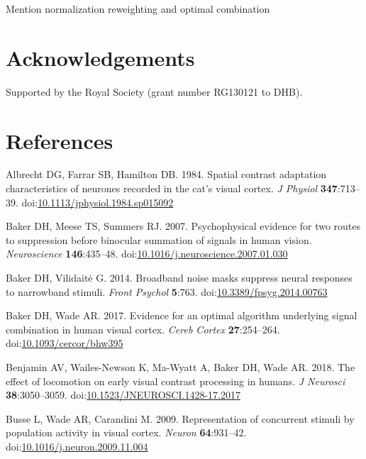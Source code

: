 \documentclass[]{article}
\begin{document}
Mention normalization reweighting and optimal combination

\hypertarget{acknowledgements}{%
\section{Acknowledgements}\label{acknowledgements}}

Supported by the Royal Society (grant number RG130121 to DHB).

\hypertarget{references}{%
\section*{References}\label{references}}

\hypertarget{refs}{}
\leavevmode\hypertarget{ref-Albrecht1984}{}%
Albrecht DG, Farrar SB, Hamilton DB. 1984. Spatial contrast adaptation characteristics of neurones recorded in the cat's visual cortex. \emph{J Physiol} \textbf{347}:713--39. doi:\href{https://doi.org/10.1113/jphysiol.1984.sp015092}{10.1113/jphysiol.1984.sp015092}

\leavevmode\hypertarget{ref-Baker2007}{}%
Baker DH, Meese TS, Summers RJ. 2007. Psychophysical evidence for two routes to suppression before binocular summation of signals in human vision. \emph{Neuroscience} \textbf{146}:435--48. doi:\href{https://doi.org/10.1016/j.neuroscience.2007.01.030}{10.1016/j.neuroscience.2007.01.030}

\leavevmode\hypertarget{ref-Baker2014}{}%
Baker DH, Vilidaitė G. 2014. Broadband noise masks suppress neural responses to narrowband stimuli. \emph{Front Psychol} \textbf{5}:763. doi:\href{https://doi.org/10.3389/fpsyg.2014.00763}{10.3389/fpsyg.2014.00763}

\leavevmode\hypertarget{ref-Baker2017}{}%
Baker DH, Wade AR. 2017. Evidence for an optimal algorithm underlying signal combination in human visual cortex. \emph{Cereb Cortex} \textbf{27}:254--264. doi:\href{https://doi.org/10.1093/cercor/bhw395}{10.1093/cercor/bhw395}

\leavevmode\hypertarget{ref-Benjamin2018}{}%
Benjamin AV, Wailes-Newson K, Ma-Wyatt A, Baker DH, Wade AR. 2018. The effect of locomotion on early visual contrast processing in humans. \emph{J Neurosci} \textbf{38}:3050--3059. doi:\href{https://doi.org/10.1523/JNEUROSCI.1428-17.2017}{10.1523/JNEUROSCI.1428-17.2017}

\leavevmode\hypertarget{ref-Busse2009}{}%
Busse L, Wade AR, Carandini M. 2009. Representation of concurrent stimuli by population activity in visual cortex. \emph{Neuron} \textbf{64}:931--42. doi:\href{https://doi.org/10.1016/j.neuron.2009.11.004}{10.1016/j.neuron.2009.11.004}
\end{document}
